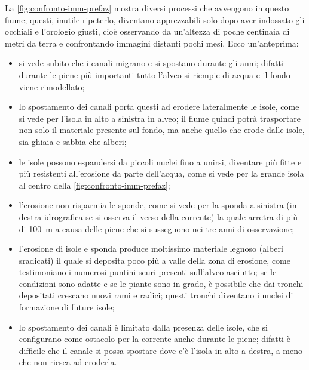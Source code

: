 \medskip
La \cref{fig:confronto-imm-prefaz} mostra diversi processi che avvengono in questo fiume; questi, inutile ripeterlo, diventano apprezzabili solo dopo aver indossato gli occhiali e l'orologio giusti, cioè osservando da un'altezza di poche centinaia di metri da terra e confrontando immagini distanti pochi mesi. Ecco un'anteprima:
\begin{itemize}
	\item si vede subito che i canali migrano e si spostano durante gli anni; 
		difatti durante le piene più importanti tutto l'alveo si riempie di acqua e il fondo viene rimodellato;
	\item lo spostamento dei canali porta questi ad erodere lateralmente le isole, come si vede per l'isola in alto a sinistra in alveo; 
		il fiume quindi potrà trasportare non solo il materiale presente sul fondo, ma anche quello che erode dalle isole, sia ghiaia e sabbia che alberi;
	\item le isole possono espandersi da piccoli nuclei fino a unirsi, diventare più fitte e più resistenti all'erosione da parte dell'acqua, come si vede per la grande isola al centro della \cref{fig:confronto-imm-prefaz};
	\item l'erosione non risparmia le sponde, come si vede per la sponda a sinistra (in destra idrografica se si osserva il verso della corrente) la quale arretra di più di \SI{100}{\m} a causa delle piene che si susseguono nei tre anni di osservazione;
	\item l'erosione di isole e sponda produce moltissimo materiale legnoso (alberi sradicati) il quale si deposita poco più a valle della zona di erosione, come testimoniano i numerosi puntini scuri presenti sull'alveo asciutto; 
		se le condizioni sono adatte e se le piante sono in grado, è possibile che dai tronchi depositati crescano nuovi rami e radici; 
		questi tronchi diventano i nuclei di formazione di future isole;
	\item lo spostamento dei canali è limitato dalla presenza delle isole, che si configurano come ostacolo per la corrente anche durante le piene;
		difatti è difficile che il canale si possa spostare dove c'è l'isola in alto a destra, a meno che non riesca ad eroderla.
\end{itemize}

